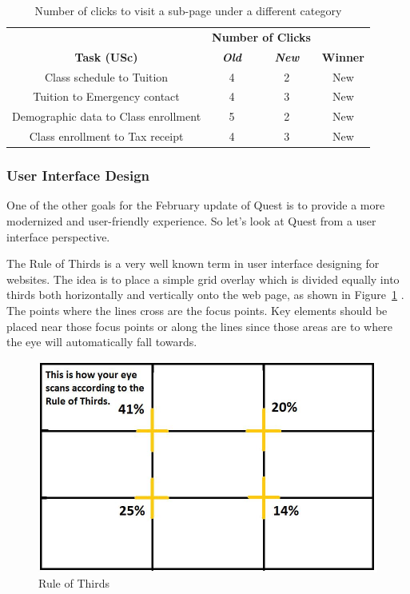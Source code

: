 \documentclass[conference]{IEEEtran}
\begin{document}
\begin{table}[htbp]
\caption{Number of clicks to visit a sub-page under a different category}
\begin{center}
\begin{tabular}{|c|c|c|c|}
\hline
\textbf{}&\multicolumn{2}{|c|}{\textbf{Number of Clicks}}&\textbf{} \\
\cline{2-3} 
\textbf{Task (USc)} & \textbf{\textit{Old}}& \textbf{\textit{New}} & \textbf{Winner} \\
\hline
Class schedule to Tuition & 4 & 2 & New \\ \hline
Tuition to Emergency contact & 4 & 3 & New \\ \hline
Demographic data to Class enrollment & 5 & 2 & New \\ \hline
Class enrollment to Tax receipt  & 4 & 3 & New \\ \hline

\end{tabular}
\label{tab2}
\end{center}
\end{table}

\subsubsection{User Interface Design}
One of the other goals for the February update of Quest is to provide a more modernized and user-friendly experience. So let's look at Quest from a user interface perspective. 

The Rule of Thirds is a very well known term in user interface designing for websites. The idea is to place a simple grid overlay which is divided equally into thirds both horizontally and vertically onto the web page, as shown in Figure~\ref{fig:figure8} \cite{b10}\cite{b11}. The points where the lines cross are the focus points. Key elements should be placed near those focus points or along the lines since those areas are to where the eye will automatically fall towards.  

\begin{figure}[htdp]
\centering
  \includegraphics[width=1\columnwidth]{rule_of_thirds.jpg}
  \caption{Rule of Thirds \cite{b10}}
  \label{fig:figure8}
\end{figure}
\end{document}

